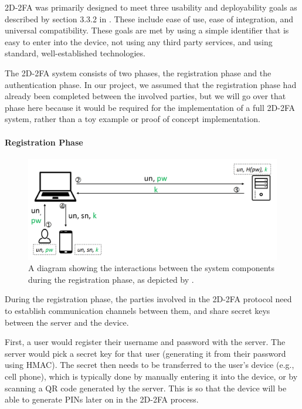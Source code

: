 \documentclass[11pt]{article}
\begin{document}
2D-2FA was primarily designed to meet three usability and deployability
goals as described by section 3.3.2 in \cite{shirvanian2d2fa}. These
include ease of use, ease of integration, and universal compatibility.
These goals are met by using a simple identifier that is easy to enter
into the device, not using any third party services, and using standard,
well-established technologies. 

The 2D-2FA system consists of two phases, the registration phase and the
authentication phase. In our project, we assumed that the registration
phase had already been completed between the involved parties, but we
will go over that phase here because it would be required for the
implementation of a full 2D-2FA system, rather than a toy example or
proof of concept implementation.

\paragraph{Registration Phase}

\begin{figure}
    \centering
    \includegraphics[scale=0.3]{registration.PNG}
    \caption{A diagram showing the interactions between the system
    components during the registration phase, as depicted by
    \cite{shirvanian2d2fa}.}
\end{figure}

During the registration phase, the parties involved in the 2D-2FA
protocol need to establish communication channels between them, and
share secret keys between the server and the device. 

First, a user would register their username and password with the
server. The server would pick a secret key for that user (generating it
from their password using HMAC). The secret then needs to be transferred
to the user's device (e.g., cell phone), which is typically done by
manually entering it into the device, or by scanning a QR code generated
by the server. This is so that the device will be able to generate PINs
later on in the 2D-2FA process. 
\end{document}
